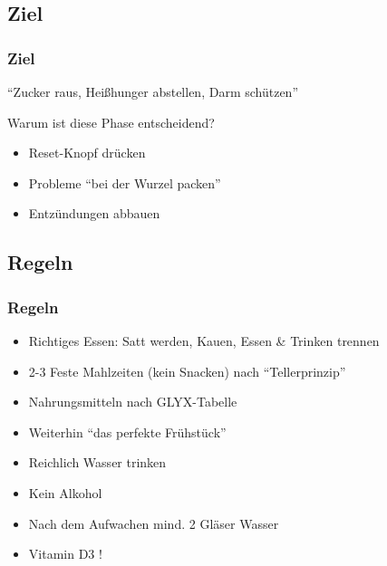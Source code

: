 \documentclass[xcolor=dvipsnames]{beamer}
\begin{document}
    \subsection{Ziel}
    \begin{frame}
        \frametitle{Ziel}
        "`Zucker raus, Heißhunger abstellen, Darm schützen"'
        \begin{block}{Warum ist diese Phase entscheidend?}
            \begin{itemize}
                \setlength\itemsep{1em}
                \item Reset-Knopf drücken
                \item Probleme "`bei der Wurzel packen"'
                \item Entzündungen abbauen
            \end{itemize}
        \end{block}
    \end{frame}

    \subsection{Regeln}
    \begin{frame}
        \frametitle{Regeln}
        \begin{itemize}
            \setlength\itemsep{1em}
            \item Richtiges Essen: Satt werden, Kauen, Essen \& Trinken trennen
            \item 2-3 Feste Mahlzeiten (kein Snacken) nach "`Tellerprinzip"'
            \item Nahrungsmitteln nach GLYX-Tabelle
            \item Weiterhin "`das perfekte Frühstück"'
            \item Reichlich Wasser trinken
            \item Kein Alkohol
            \item Nach dem Aufwachen mind. 2 Gläser Wasser
            \item Vitamin D3 !
        \end{itemize}
    \end{frame}
\end{document}
